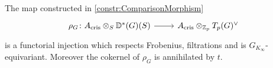 \begin{thm}
	The map constructed in \cref{constr:ComparisonMorphism}
	\begin{equation*}
	\begin{tikzcd}[row sep = 0ex
		,/tikz/column 1/.append style={anchor=base east}
		,/tikz/column 2/.append style={anchor=base west}]
		\rho_G\colon A_{\mathrm{cris}} \otimes_S \mathbb{D}^*(G)(S) 
		\arrow[r, "", rightarrow] &
		A_{\mathrm{cris}} \otimes_{\mathbb{Z}_{p}} T_p(G)^\vee
	\end{tikzcd}
	\end{equation*} 
	is a functorial injection which respects Frobenius,
	filtrations and is $G_{K_\infty}$-equivariant.
	Moreover the cokernel of $\rho_G$ is annihilated by $t$.
\end{thm}
